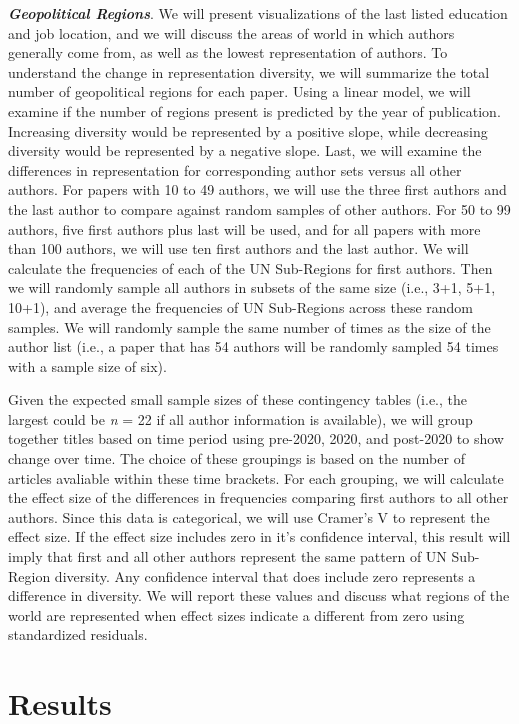 \documentclass[
  man]{apa6}
\begin{document}
\textbf{\emph{Geopolitical Regions}}. We will present visualizations of the last listed education and job location, and we will discuss the areas of world in which authors generally come from, as well as the lowest representation of authors. To understand the change in representation diversity, we will summarize the total number of geopolitical regions for each paper. Using a linear model, we will examine if the number of regions present is predicted by the year of publication. Increasing diversity would be represented by a positive slope, while decreasing diversity would be represented by a negative slope. Last, we will examine the differences in representation for corresponding author sets versus all other authors. For papers with 10 to 49 authors, we will use the three first authors and the last author to compare against random samples of other authors. For 50 to 99 authors, five first authors plus last will be used, and for all papers with more than 100 authors, we will use ten first authors and the last author. We will calculate the frequencies of each of the UN Sub-Regions for first authors. Then we will randomly sample all authors in subsets of the same size (i.e., 3+1, 5+1, 10+1), and average the frequencies of UN Sub-Regions across these random samples. We will randomly sample the same number of times as the size of the author list (i.e., a paper that has 54 authors will be randomly sampled 54 times with a sample size of six).

Given the expected small sample sizes of these contingency tables (i.e., the largest could be \emph{n} = 22 if all author information is available), we will group together titles based on time period using pre-2020, 2020, and post-2020 to show change over time. The choice of these groupings is based on the number of articles avaliable within these time brackets. For each grouping, we will calculate the effect size of the differences in frequencies comparing first authors to all other authors. Since this data is categorical, we will use Cramer's V to represent the effect size. If the effect size includes zero in it's confidence interval, this result will imply that first and all other authors represent the same pattern of UN Sub-Region diversity. Any confidence interval that does include zero represents a difference in diversity. We will report these values and discuss what regions of the world are represented when effect sizes indicate a different from zero using standardized residuals.

\hypertarget{results}{%
\section{Results}\label{results}}
\end{document}
